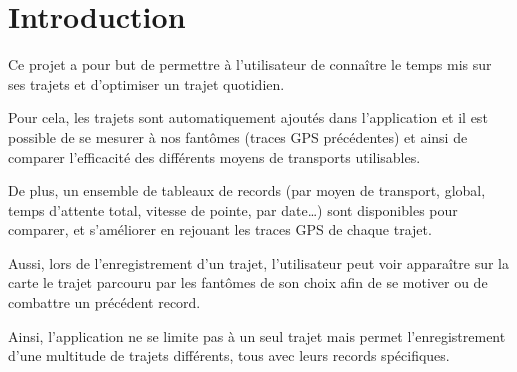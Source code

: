 \chapter{Introduction}


Ce projet a pour but de permettre à l’utilisateur de connaître le temps mis sur ses trajets et d’optimiser un trajet quotidien.

Pour cela, les trajets sont automatiquement ajoutés dans l’application et il est possible de se mesurer à nos fantômes (traces GPS précédentes) et ainsi de comparer l'efficacité des différents moyens de transports utilisables.

De plus, un ensemble de tableaux de records (par moyen de transport, global, temps d’attente total, vitesse de pointe, par date…) sont disponibles pour comparer, et s’améliorer en rejouant les traces GPS de chaque trajet.

Aussi, lors de l’enregistrement d’un trajet, l’utilisateur peut voir apparaître sur la carte le trajet parcouru par les fantômes de son choix afin de se motiver ou de combattre un précédent record.

Ainsi, l’application ne se limite pas à un seul trajet mais permet l’enregistrement d’une multitude de trajets différents, tous avec leurs records spécifiques.
